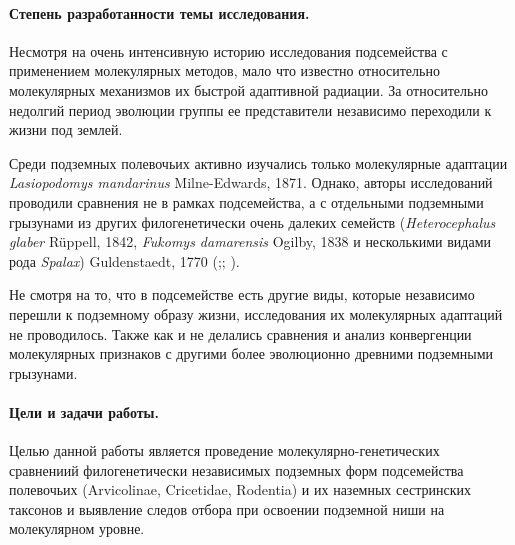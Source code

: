 

\paragraph{Степень разработанности темы исследования.} Несмотря на очень интенсивную историю исследования подсемейства с применением молекулярных методов, мало что известно относительно молекулярных механизмов их быстрой адаптивной радиации. За относительно недолгий период эволюции группы ее представители независимо переходили к жизни под землей. %


Среди подземных полевочьих активно изучались только молекулярные адаптации \textit{Lasiopodomys mandarinus} Milne-Edwards, 1871. Однако, авторы исследований проводили сравнения не в рамках подсемейства, а с отдельными подземными грызунами из других филогенетически очень далеких семейств (\textit{Heterocephalus glaber} Rüppell, 1842, \textit{Fukomys damarensis} Ogilby, 1838 и несколькими видами рода \textit{Spalax}) Guldenstaedt, 1770 (\cite{Sun2020};\cite{Sun2018a}; \cite{Dong2020}).

Не смотря на то, что в подсемействе есть другие виды, которые независимо перешли к подземному образу жизни, исследования их молекулярных адаптаций не проводилось. Также как и не делались сравнения и анализ конвергенции молекулярных признаков с другими более эволюционно древними подземными грызунами.

\paragraph{Цели и задачи работы.} Целью данной работы является проведение молекулярно-генетических сравнениий филогенетически независимых подземных форм подсемейства полевочьих (Arvicolinae, Cricetidae, Rodentia) и их наземных сестринских таксонов и выявление следов отбора при освоении подземной ниши на молекулярном уровне.

